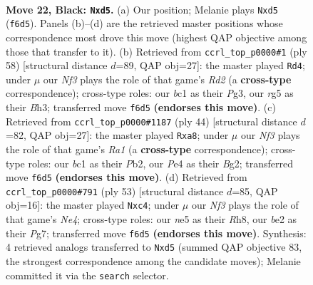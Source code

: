 \documentclass[11pt]{article}
\begin{document}
\clearpage

\begin{figure}[p]\centering
\begin{subfigure}{0.46\textwidth}\centering
\resizebox{\linewidth}{!}{%
\newchessgame
\chessboard[
  setfen={rnr3k1/p4pbp/Pp3n2/1P1PN1R1/4p3/8/4BPP1/R1B1K3 b Q - 3 22},
  showmover=false,
  pgfstyle=straightmove, color=movearrow, markmove={f6-d5}
]}
\caption{}
\end{subfigure}\hfill
\begin{subfigure}{0.46\textwidth}\centering
\resizebox{\linewidth}{!}{%
\newchessgame
\chessboard[
  setfen={2b2r2/1p2r1k1/p1p2n1p/2N2p2/7P/1P3PPB/P2R1K2/2R5 w - - 0 30},
  showmover=false,
  pgfstyle=straightmove, color=movearrow, markmove={d2-d4}
]}
\caption{}
\end{subfigure}
\\[4pt]
\begin{subfigure}{0.46\textwidth}\centering
\resizebox{\linewidth}{!}{%
\newchessgame
\chessboard[
  setfen={rn4k1/1b3rp1/1p2p2p/1P1pp3/4P2P/2N3P1/1P4B1/R3K2R w KQ - 0 23},
  showmover=false,
  pgfstyle=straightmove, color=movearrow, markmove={a1-a8}
]}
\caption{}
\end{subfigure}\hfill
\begin{subfigure}{0.46\textwidth}\centering
\resizebox{\linewidth}{!}{%
\newchessgame
\chessboard[
  setfen={7r/1r3kp1/p1b1p3/3nnpP1/2NR4/2P2P1p/P3PK1P/R1B4B b - - 2 27},
  showmover=false,
  pgfstyle=straightmove, color=movearrow, markmove={e5-c4}
]}
\caption{}
\end{subfigure}
\caption{\textbf{Move 22, Black: \texttt{Nxd5}.} (a) Our position; Melanie plays \texttt{Nxd5} (\texttt{f6d5}). Panels (b)--(d) are the retrieved master positions whose correspondence most drove this move (highest QAP objective among those that transfer to it). (b) Retrieved from \texttt{ccrl\_top\_p0000\#1} (ply 58) [structural distance $d$=89, QAP obj=27]: the master played \texttt{Rd4}; under $\mu$ our \emph{Nf3} plays the role of that game's \emph{Rd2} (a \textbf{cross-type} correspondence); cross-type roles: our \emph{b}c1 as their \emph{P}g3, our \emph{r}g5 as their \emph{B}h3; transferred move \texttt{f6d5} \textbf{(endorses this move)}. (c) Retrieved from \texttt{ccrl\_top\_p0000\#1187} (ply 44) [structural distance $d$=82, QAP obj=27]: the master played \texttt{Rxa8}; under $\mu$ our \emph{Nf3} plays the role of that game's \emph{Ra1} (a \textbf{cross-type} correspondence); cross-type roles: our \emph{b}c1 as their \emph{P}b2, our \emph{P}e4 as their \emph{B}g2; transferred move \texttt{f6d5} \textbf{(endorses this move)}. (d) Retrieved from \texttt{ccrl\_top\_p0000\#791} (ply 53) [structural distance $d$=85, QAP obj=16]: the master played \texttt{Nxc4}; under $\mu$ our \emph{Nf3} plays the role of that game's \emph{Ne4}; cross-type roles: our \emph{n}e5 as their \emph{R}h8, our \emph{b}e2 as their \emph{P}g7; transferred move \texttt{f6d5} \textbf{(endorses this move)}. Synthesis: 4 retrieved analogs transferred to \texttt{Nxd5} (summed QAP objective 83, the strongest correspondence among the candidate moves); Melanie committed it via the \texttt{search} selector.}
\label{fig:thought-m43}
\end{figure}
\end{document}
